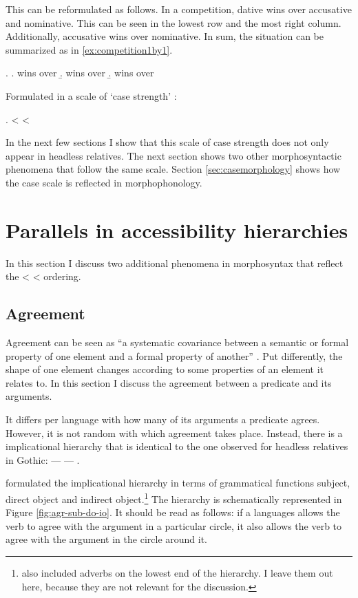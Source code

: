 This can be reformulated as follows. In a competition, dative wins over accusative and nominative. This can be seen in the lowest row and the most right column. Additionally, accusative wins over nominative. In sum, the situation can be summarized as in \ref{ex:competition1by1}.

\ex.\label{ex:competition1by1}
\a.  wins over 
\b.  wins over 
\b.  wins over 

Formulated in a scale of `case strength' \citealt{harbert1978,pittner1995,vogel2001,grosu2003,caha2019}:

\ex.  <  < \label{ex:casestrength}

In the next few sections I show that this scale of case strength does not only appear in headless relatives. The next section shows two other morphosyntactic phenomena that follow the same scale. Section \ref{sec:casemorphology} shows how the case scale is reflected in morphophonology.


\section{Parallels in accessibility hierarchies}

In this section I discuss two additional phenomena in morphosyntax that reflect the  <  <  ordering.

\subsection{Agreement}

Agreement can be seen as ``a systematic covariance between a semantic or formal property of one element and a formal property of another'' \citep{steel1978}. Put differently, the shape of one element changes according to some properties of an element it relates to. In this section I discuss the agreement between a predicate and its arguments.

It differs per language with how many of its arguments a predicate agrees. However, it is not random with which agreement takes place. Instead, there is a implicational hierarchy that is identical to the one observed for headless relatives in Gothic:  ---  --- .

\citet{moravcsik1978} formulated the implicational hierarchy in terms of grammatical functions subject, direct object and indirect object.\footnote{
\citet{moravcsik1978} also included adverbs on the lowest end of the hierarchy. I leave them out here, because they are not relevant for the discussion.
}
The hierarchy is schematically represented in Figure \ref{fig:agr-sub-do-io}. It should be read as follows: if a languages allows the verb to agree with the argument in a particular circle, it also allows the verb to agree with the argument in the circle around it.

